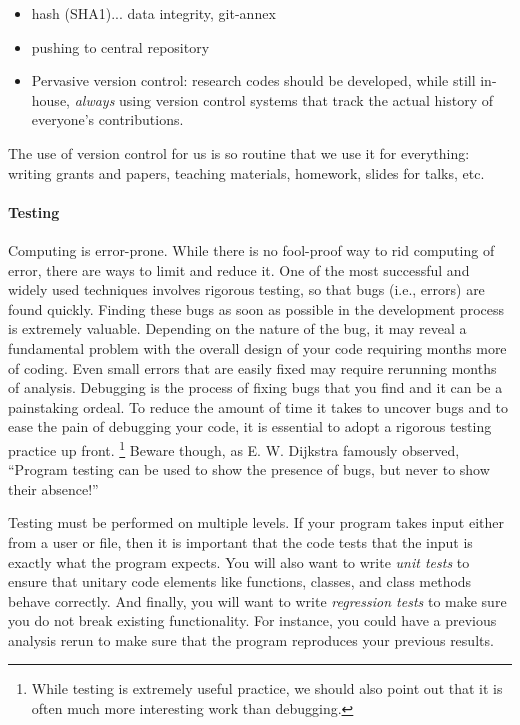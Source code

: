 \documentclass[ChapterTOCs,krantz2]{krantz} %
\begin{document}
\begin{itemize}

\item hash (SHA1)... data integrity, git-annex

\item pushing to central repository


\item Pervasive version control: research codes should be developed, while
still in-house, \emph{always} using version control systems that track
the actual history of everyone's contributions.

\end{itemize}

The use of version control for us is so routine that we use it for everything:
writing grants and papers, teaching materials, homework, slides for talks, etc.

\paragraph{ {\bf Testing}} Computing is error-prone. While there is no
fool-proof way to rid computing of error, there are ways to limit
and reduce it. One of the most successful and widely used techniques involves
rigorous testing, so that bugs (i.e., errors) are found quickly. Finding these bugs as soon as
possible in the development process is extremely valuable. Depending on the
nature of the bug, it may reveal a fundamental problem with the overall design
of your code requiring months more of coding. Even small errors that are easily
fixed may require rerunning months of analysis.  Debugging is the process of
fixing bugs that you find and it can be a painstaking ordeal. To reduce the
amount of time it takes to uncover bugs and to ease the pain of debugging your
code, it is essential to adopt a rigorous testing practice up front.%
\footnote{While testing is extremely useful practice, we should also point out
that it is often much more interesting work than debugging.}
Beware though, as E. W. Dijkstra famously observed, ``Program
testing can be used to show the presence of bugs, but never to show their
absence!'' \cite{dahl1972structured}

Testing must be performed on multiple levels. If your program takes input
either from a user or file, then it is important that the code tests that the
input is exactly what the program expects. You will also want to write
\emph{unit tests} to ensure that unitary code elements like functions, classes,
and class methods behave correctly. And finally, you will want to write
\emph{regression tests} to make sure you do not break existing functionality.
For instance, you could have a previous analysis rerun to make sure that the
program reproduces your previous results.
\end{document}
